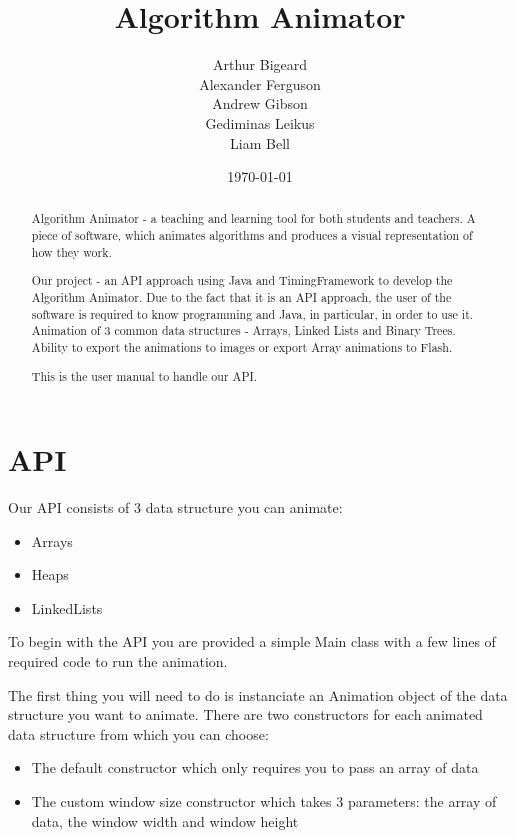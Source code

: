 \documentclass{l3proj}
\begin{document}
\title{Algorithm Animator}
\author{Arthur Bigeard \\
		Alexander Ferguson \\
		Andrew Gibson \\
		Gediminas Leikus \\
		Liam Bell}
\usdate
\date{\today}
\maketitle
\begin{abstract}

Algorithm Animator - a teaching and learning tool for both students and teachers. A piece of software, which animates algorithms and produces a visual representation of how they work.

Our project - an API approach using Java and TimingFramework to develop the Algorithm Animator. Due to the fact that it is an API approach, the user of the software is required to know programming and Java, in particular, in order to use it. Animation of 3 common data structures - Arrays, Linked Lists and Binary Trees. Ability to export the animations to images or export Array animations to Flash.

This is the user manual to handle our API.
\end{abstract}
\educationalconsent

\chapter{API}
Our API consists of 3 data structure you can animate:
\begin{itemize}
\item Arrays
\item Heaps
\item LinkedLists
\end{itemize}

To begin with the API you are provided a simple Main class with a few lines of required code to run the animation.



The first thing you will need to do is instanciate an Animation object of the data structure you want to animate. There are two constructors for
each animated data structure from which you can choose:
\begin{itemize}
\item The default constructor which only requires you to pass an array of data
\item The custom window size constructor which takes 3 parameters: the array of data, the window width and window height
\end{itemize}
\end{document}
